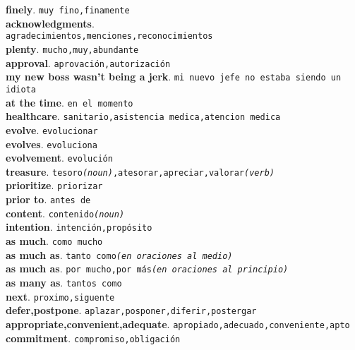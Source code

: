 \documentclass[twocolumn]{article}
\begin{document}
	\textsf{\textbf{finely}}. \texttt{muy fino,finamente}\\
	\textsf{\textbf{acknowledgments}}.\\ \texttt{agradecimientos,menciones,reconocimientos}\\
	\textsf{\textbf{plenty}}. \texttt{mucho,muy,abundante}\\
	\textsf{\textbf{approval}}. \texttt{aprovaci\'on,autorizaci\'on}\\
	\textsf{\textbf{my new boss wasn't being a jerk}}. \texttt{mi nuevo jefe no estaba siendo un idiota}\\
	\textsf{\textbf{at the time}}. \texttt{en el momento}\\
	\textsf{\textbf{healthcare}}. \texttt{sanitario,asistencia medica,atencion medica}\\
	\textsf{\textbf{evolve}}. \texttt{evolucionar}\\
	\textsf{\textbf{evolves}}. \texttt{evoluciona}\\
	\textsf{\textbf{evolvement}}. \texttt{evoluci\'on}\\
    \textsf{\textbf{treasure}}. \texttt{tesoro{\scriptsize \textsl{(noun)}},atesorar,apreciar,valorar{\scriptsize \textsl{(verb)}}}\\
	\textsf{\textbf{prioritize}}. \texttt{priorizar}\\
	\textsf{\textbf{prior to}}. \texttt{antes de}\\
	\textsf{\textbf{content}}. \texttt{contenido{\scriptsize \textsl{(noun)}}}\\
	\textsf{\textbf{intention}}. \texttt{intenci\'on,prop\'osito}\\
	\textsf{\textbf{as much}}. \texttt{como mucho}\\
	\textsf{\textbf{as much as}}. \texttt{tanto como{\scriptsize \textsl{(en oraciones al medio)}}}\\
	\textsf{\textbf{as much as}}. \texttt{por mucho,por m\'as{\scriptsize \textsl{(en oraciones al principio)}}}\\
	\textsf{\textbf{as many as}}. \texttt{tantos como}\\
	\textsf{\textbf{next}}. \texttt{proximo,siguente}\\
	\textsf{\textbf{defer,postpone}}. \texttt{aplazar,posponer,diferir,postergar}\\
	\textsf{\textbf{appropriate,convenient,adequate}}. \texttt{apropiado,adecuado,conveniente,apto}\\
	\textsf{\textbf{commitment}}. \texttt{compromiso,obligaci\'on}\\
\end{document}
